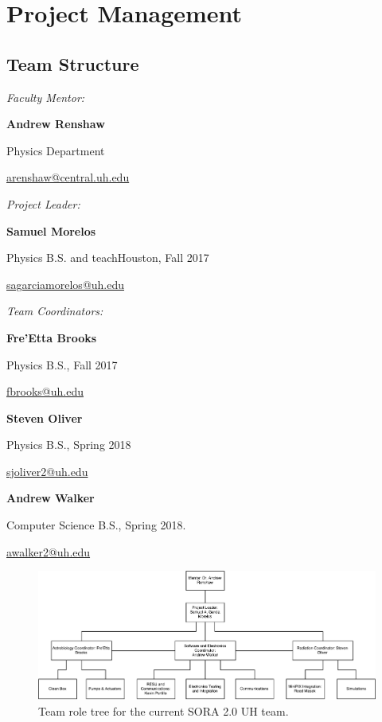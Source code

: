 \section{Project Management}
\label{sec:Management}

\subsection{Team Structure}
\label{sec:Team}
\emph{Faculty Mentor:}\par
    \textbf{Andrew Renshaw}\par
    Physics Department\par
    \url{arenshaw@central.uh.edu}\par
    \vspace{.1in}
\emph{Project Leader:}\par
    \textbf{Samuel Morelos}\par
    Physics B.S. and teachHouston, Fall 2017\par
    \url{sagarciamorelos@uh.edu}\par
    \vspace{.1in}
\emph{Team Coordinators:}\par
	\textbf{Fre’Etta Brooks}\par
    Physics B.S., Fall 2017\par
    \url{fbrooks@uh.edu}\par
    \textbf{Steven Oliver}\par
    Physics B.S., Spring 2018\par
    \url{sjoliver2@uh.edu}\par
    \textbf{Andrew Walker}\par
    Computer Science B.S., Spring 2018.\par
	\url{awalker2@uh.edu}\par

\begin{figure}[!h]
\begin{center}
\includegraphics[width=1\textwidth]{./Figures/RoleTree.pdf}
\caption{Team role tree for the current SORA 2.0 UH team.}
\label{fig:role} 
\end{center}
\end{figure}

